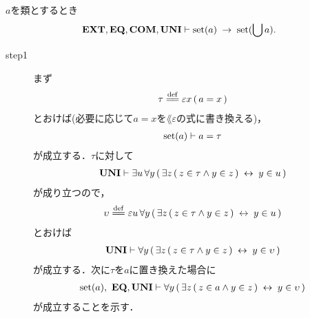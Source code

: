 	\begin{screen}
		\begin{thm}[集合の合併は集合]
		\label{thm:union_of_a_set_is_a_set}
			$a$を類とするとき
			\begin{align}
				\mbox{{\bf EXT}},\mbox{{\bf EQ}},\mbox{\bf COM},\mbox{{\bf UNI}} \vdash \operatorname*{set} (a) \hspace{0.25em}\rightarrow\hspace{0.25em} \operatorname*{set} (\bigcup a).
			\end{align}
		\end{thm}
	\end{screen}
	
	\begin{sketch}\mbox{}
		\begin{description}
			\item[step1]
				まず
				\begin{align}
					\tau \defeq \varepsilon x\, (\, a = x\, )
				\end{align}
				とおけば(必要に応じて$a = x$を$\lang{\varepsilon}$の式に書き換える)，
				\begin{align}
					\operatorname*{set} (a) \vdash a = \tau
				\end{align}
				が成立する．$\tau$に対して
				\begin{align}
					\mbox{{\bf UNI}} \vdash \exists u\, \forall y\, (\, \exists z\, (\, z \in \tau \wedge y \in z\, ) \hspace{0.25em}\leftrightarrow\hspace{0.25em} y \in u\, )
				\end{align}
				が成り立つので，
				\begin{align}
					\upsilon \defeq \varepsilon u\, \forall y\, (\, \exists z\, (\, z \in \tau \wedge y \in z\, ) \lrarrow y \in u\, )
				\end{align}
				とおけば
				\begin{align}
					\mbox{{\bf UNI}} \vdash \forall y\, (\, \exists z\, (\, z \in \tau \wedge y \in z\, ) \hspace{0.25em}\leftrightarrow\hspace{0.25em} y \in \upsilon\, )
					\label{fom:union_of_a_set_is_a_set_1}
				\end{align}
				が成立する．次に$\tau$を$a$に置き換えた場合に
				\begin{align}
					\operatorname*{set} (a),\ \mbox{{\bf EQ}},\mbox{{\bf UNI}} \vdash \forall y\, (\, \exists z\, (\, z \in a \wedge y \in z\, ) \hspace{0.25em}\leftrightarrow\hspace{0.25em} y \in \upsilon\, )
				\end{align}
				が成立することを示す．
				

\end{description}
\end{sketch}
